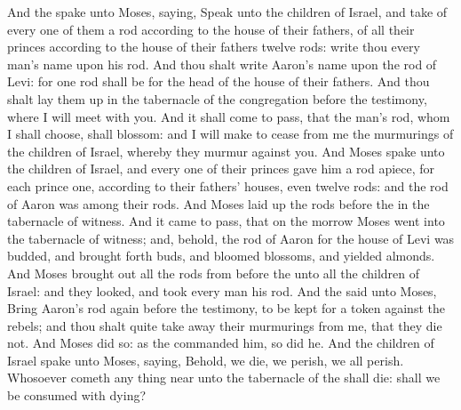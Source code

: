 \begin{biblechapter} %
 And the \LORD spake unto Moses, saying,
\verse Speak unto the children of Israel, and take of every one of them a rod according to the house of their fathers, of all their princes according to the house of their fathers twelve rods: write thou every man's name upon his rod.
\verse And thou shalt write Aaron's name upon the rod of Levi: for one rod shall be for the head of the house of their fathers.
\verse And thou shalt lay them up in the tabernacle of the congregation before the testimony, where I will meet with you.
\verse And it shall come to pass, that the man's rod, whom I shall choose, shall blossom: and I will make to cease from me the murmurings of the children of Israel, whereby they murmur against you.
\verse And Moses spake unto the children of Israel, and every one of their princes gave him a rod apiece, for each prince one, according to their fathers' houses, even twelve rods: and the rod of Aaron was among their rods.
\verse And Moses laid up the rods before the \LORD in the tabernacle of witness.
\verse And it came to pass, that on the morrow Moses went into the tabernacle of witness; and, behold, the rod of Aaron for the house of Levi was budded, and brought forth buds, and bloomed blossoms, and yielded almonds.
\verse And Moses brought out all the rods from before the \LORD unto all the children of Israel: and they looked, and took every man his rod.
\verse And the \LORD said unto Moses, Bring Aaron's rod again before the testimony, to be kept for a token against the rebels; and thou shalt quite take away their murmurings from me, that they die not.
\verse And Moses did so: as the \LORD commanded him, so did he.
\verse And the children of Israel spake unto Moses, saying, Behold, we die, we perish, we all perish.
\verse Whosoever cometh any thing near unto the tabernacle of the \LORD shall die: shall we be consumed with dying?
\end{biblechapter}

